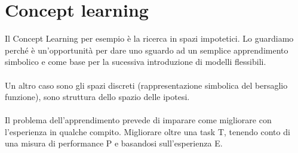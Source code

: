 \newpage
\section{Concept learning}
Il Concept Learning per esempio è la ricerca in spazi impotetici. Lo guardiamo perché è 
un'opportunità per dare uno sguardo ad un semplice apprendimento simbolico e come base per la sucessiva
introduzione di modelli flessibili.\\\\
Un altro caso sono gli spazi discreti (rappresentazione simbolica del bersaglio funzione), sono struttura dello
spazio delle ipotesi.\\\\
Il problema dell'apprendimento prevede di imparare come migliorare con l'esperienza in qualche compito. Migliorare oltre una task T,
tenendo conto di una misura di performance P e basandosi sull'esperienza E.

